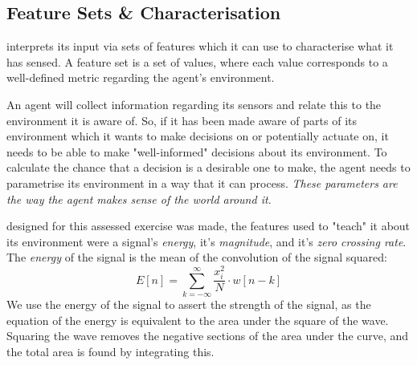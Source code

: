 \documentclass{tufte-handout}
\begin{document}
\subsection{Feature Sets \& Characterisation}
 interprets its input via sets of features which it can use to characterise what it has sensed. A feature set is a set of values, where each value corresponds to a well-defined metric regarding the agent's environment. \par
An agent will collect information regarding its sensors and relate this to the environment it is aware of. So, if it has been made aware of parts of its environment which it wants to make decisions on or potentially actuate on, it needs to be able to make "well-informed" decisions about its environment. To calculate the chance that a decision is a desirable one to make, the agent needs to parametrise its environment in a way that it can process. \emph{These parameters are the way the agent makes sense of the world around it.}\par
 designed for this assessed exercise was made, the features used to "teach" it about its environment were a signal's \emph{energy}, it's \emph{magnitude}, and it's \emph{zero crossing rate}.\\
The \emph{energy} of the signal is the mean of the convolution of the signal squared:
\[E[n] = \sum_{k = -\infty}^{\infty}\frac{x^{2}_i}{N} \cdot w[n - k]\]
We use the energy of the signal to assert the strength of the signal, as the equation of the energy is equivalent to the area under the square of the wave. Squaring the wave removes the negative sections of the area under the curve, and the total area is found by integrating this.\par 
\end{document}
